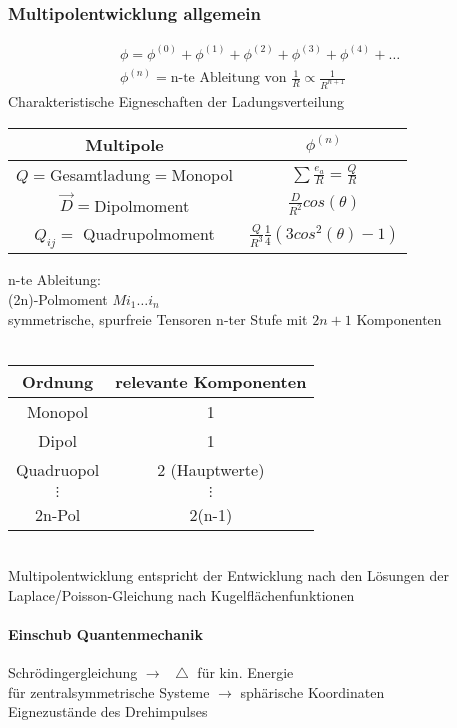 \documentclass[a4paper]{article}
\newcommand*\laplace{\mathop{}\!\mathbin\bigtriangleup}
\begin{document}
\subsubsection{Multipolentwicklung allgemein}
\begin{align}
\phi=\phi^{(0)}+\phi^{(1)}+\phi^{(2)}+\phi^{(3)}+\phi^{(4)}+\ldots\\
\phi^{(n)}=\text{n-te Ableitung von }\frac{1}{R}\propto \frac{1}{R^{n+1}}
\end{align}
Charakteristische Eigneschaften der Ladungsverteilung\\
\begin{tabular}{c|c}
Multipole & $\phi^{(n)}$\\
\hline
$Q=$Gesamtladung$=$Monopol & $\sum \frac{e_a}{R}=\frac{Q}{R}$\\
$\vec{D}=$Dipolmoment &$\frac{D}{R^2}cos(\theta)$\\
$Q_{ij}=$ Quadrupolmoment & $\frac{Q}{R^3}\frac{1}{4}\left(3
cos^2(\theta)-1\right)$\\
\end{tabular}
n-te Ableitung:\\ 
(2n)-Polmoment $M{i_1\ldots i_n}$\\
symmetrische, spurfreie Tensoren n-ter Stufe mit $2n+1$  Komponenten\\\\
\begin{tabular}{c|c}
Ordnung & relevante Komponenten\\
\hline
Monopol & 1\\
Dipol & 1\\
Quadruopol & 2 (Hauptwerte)\\
$\vdots$&$\vdots$\\
2n-Pol & 2(n-1)
\end{tabular}\\

Multipolentwicklung entspricht der Entwicklung nach den Lösungen der
Laplace/Poisson-Gleichung nach Kugelflächenfunktionen
\paragraph{Einschub Quantenmechanik}
Schrödingergleichung
$\rightarrow \laplace$ für kin. Energie\\
für zentralsymmetrische Systeme $\rightarrow$ sphärische Koordinaten\\
Eignezustände des Drehimpulses
\end{document}
